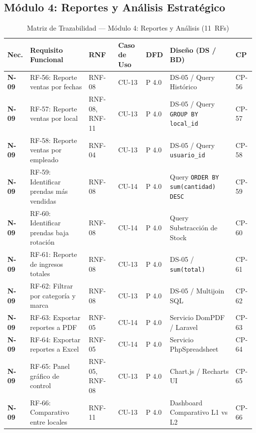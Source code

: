 \subsection{M\'odulo 4: Reportes y An\'alisis Estrat\'egico}
\begin{table}[H]
\centering\scriptsize
\begin{tabularx}{\textwidth}{>{\centering\bfseries}p{1.2cm} Y >{\centering\arraybackslash}p{2.0cm} >{\centering\arraybackslash}p{1.5cm} >{\centering\arraybackslash}p{1.0cm} >{\raggedright\arraybackslash}p{3.0cm} >{\centering\arraybackslash}p{1.2cm}}
\toprule
\textbf{Nec.} & \textbf{Requisito Funcional} & \textbf{RNF} & \textbf{Caso de Uso} & \textbf{DFD} & \textbf{Dise\~no (DS / BD)} & \textbf{CP} \\
\midrule
N-09 & RF-56: Reporte ventas por fechas & RNF-08 & CU-13 & P 4.0 & DS-05 / Query Hist\'orico & CP-56 \\
N-09 & RF-57: Reporte ventas por local & RNF-08, RNF-11 & CU-13 & P 4.0 & DS-05 / Query \texttt{GROUP BY local\_id} & CP-57 \\
N-09 & RF-58: Reporte ventas por empleado & RNF-04 & CU-13 & P 4.0 & DS-05 / Query \texttt{usuario\_id} & CP-58 \\
N-09 & RF-59: Identificar prendas m\'as vendidas & RNF-08 & CU-14 & P 4.0 & Query \texttt{ORDER BY sum(cantidad) DESC} & CP-59 \\
N-09 & RF-60: Identificar prendas baja rotaci\'on & RNF-08 & CU-14 & P 4.0 & Query Substracci\'on de Stock & CP-60 \\
N-09 & RF-61: Reporte de ingresos totales & RNF-08 & CU-13 & P 4.0 & DS-05 / \texttt{sum(total)} & CP-61 \\
N-09 & RF-62: Filtrar por categor\'ia y marca & RNF-08 & CU-13 & P 4.0 & DS-05 / Multijoin SQL & CP-62 \\
N-09 & RF-63: Exportar reportes a PDF & RNF-05 & CU-14 & P 4.0 & Servicio DomPDF / Laravel & CP-63 \\
N-09 & RF-64: Exportar reportes a Excel & RNF-05 & CU-14 & P 4.0 & Servicio PhpSpreadsheet & CP-64 \\
N-09 & RF-65: Panel gr\'afico de control & RNF-05, RNF-08 & CU-13 & P 4.0 & Chart.js / Recharts UI & CP-65 \\
N-09 & RF-66: Comparativo entre locales & RNF-11 & CU-13 & P 4.0 & Dashboard Comparativo L1 vs L2 & CP-66 \\
\bottomrule
\end{tabularx}
\caption{Matriz de Trazabilidad --- M\'odulo 4: Reportes y An\'alisis (11~RFs)}
\label{tab:trazabilidad_modulo4}
\end{table}

